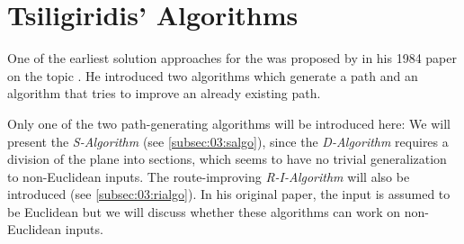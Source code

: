 \section{Tsiligiridis' Algorithms}
\label{sec:03:tsiligiridis}

One of the earliest solution approaches for the \op{} was proposed by \citeauthor{tsiligiridis_heuristic_1984} in his 1984 paper on the topic \cite{tsiligiridis_heuristic_1984}.
He introduced two algorithms which generate a path and an algorithm that tries to improve an already existing path.

Only one of the two path-generating algorithms will be introduced here:
We will present the \emph{S-Algorithm} (see \cref{subsec:03:salgo}), since the \emph{D-Algorithm} requires a division of the plane into sections, which seems to have no trivial generalization to non-Euclidean inputs.
The route-improving \emph{R-I-Algorithm} will also be introduced (see \cref{subsec:03:rialgo}).
In his original paper, the input is assumed to be Euclidean but
we will discuss whether these algorithms can work on non-Euclidean inputs.


%


